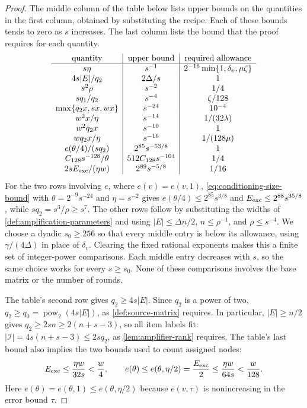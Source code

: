 \documentclass[11pt,letterpaper]{article} \usepackage[utf8]{inputenc}
\theoremstyle{plain} \newtheorem{theorem}{Theorem}[section]
\theoremstyle{definition} \newaliascnt{definition}{theorem}
\begin{document}
\begin{proof}
The middle column of the table below lists upper bounds on the quantities
in the first column, obtained by substituting the recipe. Each of these bounds
tends to zero as $s$ increases. The last column
lists the bound that the proof requires for each quantity.
\begin{equation}\label{eq:width-margins}
\begin{array}{c|c|c}
\text{quantity}&\text{upper bound}&\text{required allowance}\\ \hline
s\eta&s^{-1}&2^{-16}\min\{1,\delta_v,\mu\zeta\}\\
4s|E|/q_2&2\Delta/s&1\\
s^2\rho&s^{-2}&1/4\\
sq_1/q_2&s^{-4}&\zeta/128\\
\max\{q_2x,sx,wx\}&s^{-24}&10^{-4}\\
w^2x/\eta&s^{-14}&1/(32\lambda)\\
w^2q_2x&s^{-10}&1\\
wq_2x/\eta&s^{-16}&1/(128\mu)\\
e(\theta/4)/(sq_2)&2^{85}s^{-53/8}&1\\
C_{128}s^{-128}/\theta&512C_{128}s^{-104}&1/4\\
2sE_{\rm exc}/(\eta w)&2^{89}s^{-5/8}&1/16
\end{array}
\end{equation}
For the two rows involving $e$, where $e(v)=e(v,1)$, \eqref{eq:conditioning-size-bound} with
$\theta=2^{-9}s^{-24}$ and $\eta=s^{-2}$ gives
$e(\theta/4)\le2^{85}s^{3/8}$ and
$E_{\rm exc}\le2^{88}s^{35/8}$, while $sq_2=s^3/\rho\ge s^7$.
The other rows follow by substituting the widths of
\cref{def:amplification-parameters} and using $|E|\le\Delta n/2$, $n\le\rho^{-1}$,
and $\rho\le s^{-4}$.
We choose a dyadic $s_0\ge256$ so that every middle entry is below its allowance,
using $\gamma/(4\Delta)$ in place of $\delta_v$. Clearing the fixed rational
exponents makes this a finite set of integer-power comparisons. Each
middle entry decreases with $s$, so the same choice works for every $s\ge s_0$.
None of these comparisons involves the base matrix or the number of rounds.

The table's second row gives $q_2\ge4s|E|$. Since $q_2$ is a power of two,
$q_2\ge q_0=\operatorname{pow}_2(4s|E|)$, as \cref{def:source-matrix} requires. In particular, $|E|\ge n/2$ gives
$q_2\ge2sn\ge2(n+s-3)$, so all item labels fit: $|\mathcal I|=4s(n+s-3)\le2sq_2$, as
\cref{lem:amplifier-rank} requires. The table's last bound
also implies the two bounds used to count assigned nodes:
\[
E_{\rm exc}\le\frac{\eta w}{32s}<\frac w4,\qquad
e(\theta)\le e(\theta,\eta/2)=\frac{E_{\rm exc}}2
\le\frac{\eta w}{64s}<\frac w{128}.
\]
Here $e(\theta)=e(\theta,1)\le e(\theta,\eta/2)$ because $e(v,\tau)$ is
nonincreasing in the error bound $\tau$.


\end{proof}
\end{document}

